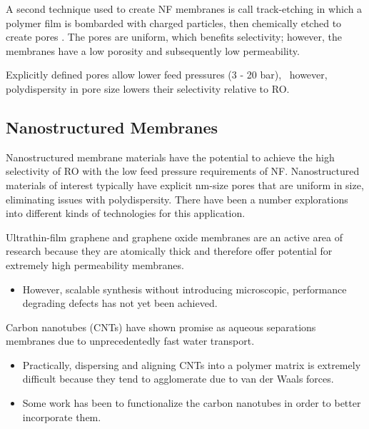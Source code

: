   A second technique used to create NF membranes is call track-etching in which a polymer
  film is bombarded with charged particles, then chemically etched to create pores
  \cite{apel_track_2001}. The pores are uniform, which benefits selectivity;
  however, the membranes have a low porosity and subsequently low permeability. 
  
  Explicitly defined pores allow lower feed pressures (3 - 20 bar),~\cite{van_der_bruggen_review_2003}
  however, polydispersity in pore size lowers their selectivity relative to RO.
  
  \subsection{Nanostructured Membranes}
  
  Nanostructured membrane materials have the potential to achieve the high selectivity
  of RO with the low feed pressure requirements of NF. Nanostructured materials of 
  interest typically have explicit nm-size pores that are uniform in size, eliminating
  issues with polydispersity. There have been a number explorations into different
  kinds of technologies for this application.
  
  Ultrathin-film
  graphene and graphene oxide membranes are an active area of research because
  they are atomically thick and therefore offer potential for extremely high
  permeability membranes.~\cite{humplik_nanostructured_2011} 
  \begin{itemize}  
    \item However, scalable synthesis without introducing microscopic, performance
    degrading defects has not yet been achieved.~\cite{cohen-tanugi_multilayer_2016,wei_multilayered_2018}
  \end{itemize}    
  
  Carbon nanotubes (CNTs) have shown promise as aqueous separations membranes
  due to unprecedentedly fast water transport.\cite{humplik_nanostructured_2011,hummer_water_2001}
  \begin{itemize}
	\item Practically, dispersing and aligning CNTs into a polymer matrix is extremely
    difficult because they tend to agglomerate due to van der Waals forces.~\cite{sahoo_polymer_2010}
    \item Some work has been to functionalize the carbon nanotubes in order to better incorporate them. %
  \end{itemize}
  

